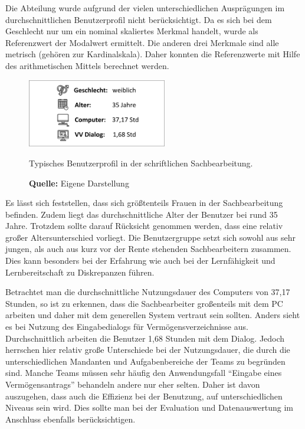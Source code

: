 Die Abteilung wurde aufgrund der vielen unterschiedlichen Ausprägungen im durchschnittlichen Benutzerprofil nicht berücksichtigt. Da es sich bei dem Geschlecht nur um ein nominal skaliertes Merkmal handelt, wurde als Referenzwert der Modalwert ermittelt. Die anderen drei Merkmale sind alle metrisch (gehören zur Kardinalskala). Daher konnten die Referenzwerte mit Hilfe des arithmetischen Mittels berechnet werden.
\begin{figure}[H]
  \centering
  \includegraphics[width=230px]{img/durchschnittliches_Benutzerprofil.png}
  \caption{Typisches Benutzerprofil in der schriftlichen Sachbearbeitung.}
  \caption*{\textbf{Quelle:} Eigene Darstellung}
  \label{fig:durchschnittlichesBenutzerprofil}
\end{figure}
Es lässt sich feststellen, dass sich größtenteils Frauen in der Sachbearbeitung befinden. Zudem liegt das durchschnittliche Alter der Benutzer bei rund 35 Jahre. Trotzdem sollte darauf Rücksicht genommen werden, dass eine relativ großer Altersunterschied vorliegt. Die Benutzergruppe setzt sich sowohl aus sehr jungen, als auch aus kurz vor der Rente stehenden Sachbearbeitern zusammen. Dies kann besonders bei der Erfahrung wie auch bei der Lernfähigkeit und Lernbereitschaft zu Diskrepanzen führen.

Betrachtet man die durchschnittliche Nutzungsdauer des Computers von 37,17 Stunden, so ist zu erkennen, dass die Sachbearbeiter großenteils mit dem PC arbeiten und daher mit dem generellen System vertraut sein sollten. Anders sieht es bei Nutzung des Eingabedialogs für Vermögensverzeichnisse aus. Durchschnittlich arbeiten die Benutzer 1,68 Stunden mit dem Dialog. Jedoch herrschen hier relativ große Unterschiede bei der Nutzungsdauer, die durch die unterschiedlichen Mandanten und Aufgabenbereiche der Teams zu begründen sind. Manche Teams müssen sehr häufig den Anwendungsfall \enquote{Eingabe eines Vermögensantrags} behandeln andere nur eher selten. Daher ist davon auszugehen, dass auch die Effizienz bei der Benutzung, auf unterschiedlichen Niveaus sein wird. Dies sollte man bei der Evaluation und Datenauswertung im Anschluss ebenfalls berücksichtigen.



